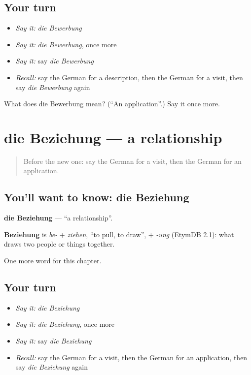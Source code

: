 \subsection*{Your turn}
\begin{itemize}
\raggedright
  \item \emph{Say it:} \emph{die Bewerbung}
  \item \emph{Say it:} \emph{die Bewerbung}, once more
  \item \emph{Say it:} say \emph{die Bewerbung}
  \item \emph{Recall:} say the German for a description, then the German for a visit, then say \emph{die Bewerbung} again
\end{itemize}

\begin{tcolorbox}[breakable,colback=teal!4,colframe=teal!35!black,title={Before you move on}]
What does die Bewerbung mean? (\textquotedblleft{}An application\textquotedblright{}.) Say it once more.
\end{tcolorbox}
\section[die Beziehung]{die Beziehung — a relationship}

\label{lesson:GE-C227-beziehung}



\begin{quote}
Before the new one: say the German for a visit, then the German for an application.
\end{quote}

\subsection*{You'll want to know: die Beziehung}
\textbf{die Beziehung} — \textquotedblleft{}a relationship\textquotedblright{}.

\begin{cousinweb}
\textbf{Beziehung} is \emph{be-} + \emph{ziehen}, \textquotedblleft{}to pull, to draw\textquotedblright{}, + \emph{-ung} (EtymDB 2.1): what draws two people or things together.
\end{cousinweb}

\begin{grammarlens}[title={What you've built}]
One more word for this chapter.
\end{grammarlens}

\subsection*{Your turn}
\begin{itemize}
\raggedright
  \item \emph{Say it:} \emph{die Beziehung}
  \item \emph{Say it:} \emph{die Beziehung}, once more
  \item \emph{Say it:} say \emph{die Beziehung}
  \item \emph{Recall:} say the German for a visit, then the German for an application, then say \emph{die Beziehung} again
\end{itemize}

